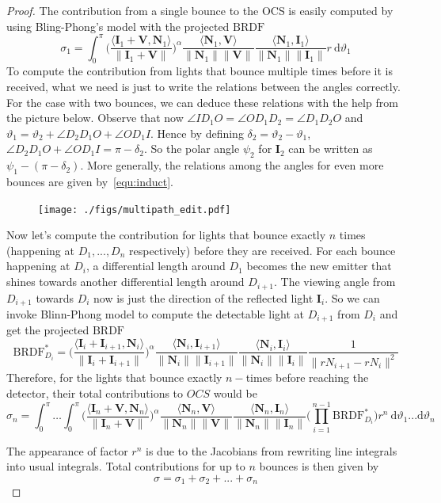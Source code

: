 \documentclass[11pt,reqno]{amsart}
\newcommand{\BRDF}{\mathrm{BRDF}}
\newcommand{\ip}[2]{\langle {#1}, {#2} \rangle}
\theoremstyle{definition}
\begin{document}
\begin{proof}
The contribution from a single bounce to the OCS is easily computed by using
Bling-Phong's model with the projected $\BRDF$
$$\sigma_1 =\int_{0}^{\pi}\Bigg(\frac{\ip{\mathbf{I}_1+\mathbf{V}}{\mathbf{N}_1}}{\|\mathbf{I}_1+\mathbf{V}\|}\Bigg)^\alpha\frac{\ip{\mathbf{N}_1}{\mathbf{V}}}{\|\mathbf{N}_1\| \|\mathbf{V}\|}\frac{\ip{\mathbf{N}_1}{\mathbf{I}_1}}{\|\mathbf{N}_1\| \|\mathbf{I}_1\|} r\:\mathrm{d}\vartheta_1$$
To compute the contribution from lights that bounce multiple times before it is received, what we need is just to write the relations between the angles correctly. For the case with two bounces, we can deduce these relations with the help from the picture below. Observe that now
$\angle{ID_1O}=\angle{OD_1D_2}=\angle{D_1D_2O}$ and $\vartheta_1=\vartheta_2+\angle{D_2D_1O}+\angle{OD_1I}$. Hence by defining $\delta_2=\vartheta_2-\vartheta_1$, $\angle{D_2D_1O}+\angle{OD_1I}=\pi-\delta_2$. So the polar angle $\psi_2$ for $\mathbf{I}_2$ can be written as $\psi_1-(\pi-\delta_2)$.  More generally,  the relations among the angles for even more bounces are given 
by~\eqref{equ:induct}.
\begin{figure}[H]
  \texttt{[image: ./figs/multipath\_edit.pdf]}
  \label{fig:reflection}
\end{figure}

Now let's compute the contribution for lights that bounce exactly $n$ times (happening at $D_1,...,D_n$ respectively) before they are received. For each bounce happening at $D_i$, a differential length around $D_1$ becomes the new emitter that shines towards another differential length around $D_{i+1}$. The viewing angle from $D_{i+1}$ towards $D_i$ now is just the direction of the reflected light $\mathbf{I}_{i}$. So we can invoke Blinn-Phong model to compute the detectable light at $D_{i+1}$ from $D_i$ and get the projected $\BRDF$
$$\BRDF^*_{D_i}= \Bigg(\frac{\ip{\mathbf{I}_i+\mathbf{I}_{i+1}}{\mathbf{N}_i}}{\|\mathbf{I}_i+\mathbf{I}_{i+1}\|}\Bigg)^\alpha \frac{\ip{\mathbf{N}_i}{\mathbf{I}_{i+1}}}{\|\mathbf{N}_i\| \|\mathbf{I}_{i+1}\|}\frac{\ip{\mathbf{N}_i}{\mathbf{I}_i}}{\|\mathbf{N}_i\| \|\mathbf{I}_i\|}\frac{1}{\|rN_{i+1}-rN_i\|^2}$$
Therefore, for the lights that bounce exactly $n-$times before reaching the detector, their total contributions to $OCS$ would be 
\begin{equation*}
\sigma_n =\int_{0}^{\pi}\ldots \int_{0}^{\pi}\Bigg(\frac{\ip{\mathbf{I}_n+\mathbf{V}}{\mathbf{N}_n}}{\|\mathbf{I}_n+\mathbf{V}\|}\Bigg)^\alpha\frac{\ip{\mathbf{N}_n}{\mathbf{V}}}{\|\mathbf{N}_n\| \|\mathbf{V}\|}\frac{\ip{\mathbf{N}_n}{\mathbf{I}_n}}{\|\mathbf{N}_n\| \|\mathbf{I}_n\|}\bigg(\prod_{i=1}^{n-1}\BRDF^*_{D_i}\bigg) r^n\: \mathrm{d}\vartheta_1...\mathrm{d}\vartheta_n
\end{equation*}

The appearance of factor $r^n$ is due to the Jacobians from rewriting line integrals into usual integrals. Total contributions for up to $n$ bounces is then given by
 $$ \sigma= \sigma_1+\sigma_2+...+\sigma_n$$
 \end{proof}
 
\end{document}
